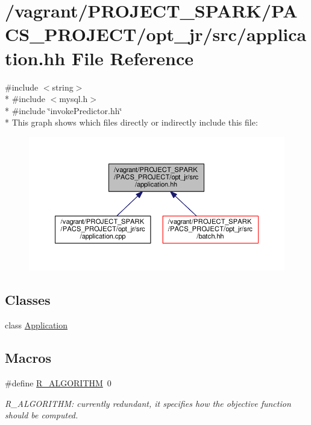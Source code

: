 \hypertarget{application_8hh}{\section{/vagrant/\-P\-R\-O\-J\-E\-C\-T\-\_\-\-S\-P\-A\-R\-K/\-P\-A\-C\-S\-\_\-\-P\-R\-O\-J\-E\-C\-T/opt\-\_\-jr/src/application.hh File Reference}
\label{application_8hh}
}
{\ttfamily \#include $<$string$>$}\\*
{\ttfamily \#include $<$mysql.\-h$>$}\\*
{\ttfamily \#include \char`\"{}invoke\-Predictor.\-hh\char`\"{}}\\*
This graph shows which files directly or indirectly include this file\-:\nopagebreak
\begin{figure}[H]
\begin{center}
\leavevmode
\includegraphics[width=350pt]{application_8hh__dep__incl}
\end{center}
\end{figure}
\subsection*{Classes}
\begin{DoxyCompactItemize}
\item 
class \hyperlink{classApplication}{Application}
\end{DoxyCompactItemize}
\subsection*{Macros}
\begin{DoxyCompactItemize}
\item 
\#define \hyperlink{application_8hh_aaeed326368abd712225f9ca34c338fbf}{R\-\_\-\-A\-L\-G\-O\-R\-I\-T\-H\-M}~0
\begin{DoxyCompactList}\small\item\em R\-\_\-\-A\-L\-G\-O\-R\-I\-T\-H\-M\-: currently redundant, it specifies how the objective function should be computed. \end{DoxyCompactList}\end{DoxyCompactItemize}


